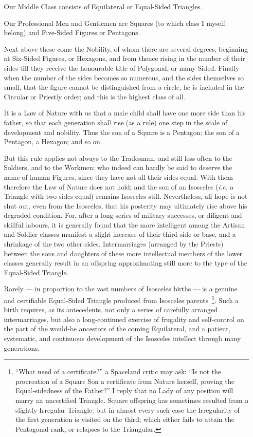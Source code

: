 \documentclass[10pt, kindle, oneside]{kindle}
\begin{document}
Our Middle Class consists of Equilateral or Equal-Sided Triangles.

Our Professional Men and Gentlemen are Squares (to which class I myself
belong) and Five-Sided Figures or Pentagons.

Next above these come the Nobility, of whom there are several degrees,
beginning at Six-Sided Figures, or Hexagons, and from thence rising in the
number of their sides till they receive the honourable title of Polygonal, or
many-Sided. Finally when the number of the sides becomes so numerous, and the
sides themselves so small, that the figure cannot be distinguished from a
circle, he is included in the Circular or Priestly order; and this is the
highest class of all.

It is a Law of Nature with us that a male child shall have one more side than
his father, so that each generation shall rise (as a rule) one step in the
scale of development and nobility. Thus the son of a Square is a Pentagon; the
son of a Pentagon, a Hexagon; and so on.

But this rule applies not always to the Tradesman, and still less often to the
Soldiers, and to the Workmen; who indeed can hardly be said to deserve the
name of human Figures, since they have not all their sides equal. With them
therefore the Law of Nature does not hold; and the son of an Isosceles (\emph{i.e.} a
Triangle with two sides equal) remains Isosceles still. Nevertheless, all hope
is not shut out, even from the Isosceles, that his posterity may ultimately
rise above his degraded condition. For, after a long series of military
successes, or diligent and skillful labours, it is generally found that the
more intelligent among the Artisan and Soldier classes manifest a slight
increase of their third side or base, and a shrinkage of the two other sides.
Intermarriages (arranged by the Priests) between the sons and daughters of
these more intellectual members of the lower classes generally result in an
offspring approximating still more to the type of the Equal-Sided Triangle.

Rarely --- in proportion to the vast numbers of Isosceles births --- is a genuine
and certifiable Equal-Sided Triangle produced from Isosceles 
parents~\footnote{``What need of a certificate?'' a Spaceland critic may ask: ``Is not
the procreation of a Square Son a certificate from Nature herself, proving the
Equal-sidedness of the Father?'' I reply that no Lady of any position will
marry an uncertified Triangle. Square offspring has sometimes resulted from a
slightly Irregular Triangle; but in almost every such case the Irregularity of
the first generation is visited on the third; which either fails to attain the
Pentagonal rank, or relapses to the Triangular.}. Such a birth requires, as
its antecedents, not only a series of carefully arranged intermarriages, but
also a long-continued exercise of frugality and self-control on the part of
the would-be ancestors of the coming Equilateral, and a patient, systematic,
and continuous development of the Isosceles intellect through many
generations.
\end{document}
